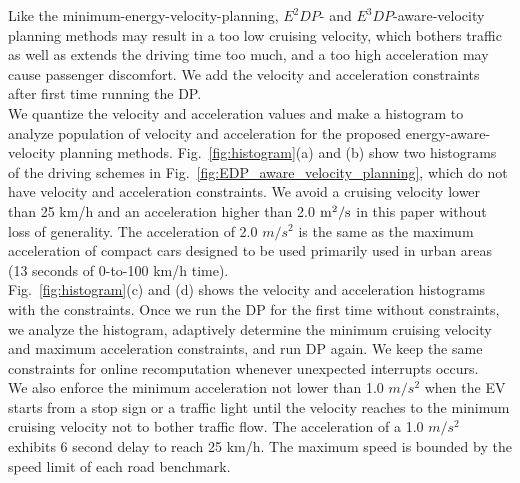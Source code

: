 \documentclass[onecolumn]{IEEEconf}
\begin{document}
\begin{description}
Like the minimum-energy-velocity-planning, $E^2DP$- and $E^3DP$-aware-velocity planning methods may result in a too low cruising velocity, which bothers traffic as well as extends the driving time too much, and a too high acceleration may cause passenger discomfort. We add the velocity and acceleration constraints after first time running the DP. \\
We quantize the velocity and acceleration values and make a histogram to analyze population of velocity and acceleration for the proposed energy-aware-velocity planning methods. Fig.~\ref{fig:histogram}(a) and (b) show two histograms of the driving schemes in Fig.~\ref{fig:EDP_aware_velocity_planning}, which do not have velocity and acceleration constraints. We avoid a cruising velocity lower than 25 km/h and an acceleration higher than 2.0 $\rm{m^2}/s$ in this paper without loss of generality. The  acceleration of 2.0 $m/s^2$ is the same as the maximum acceleration of compact cars designed to be used primarily used in urban areas (13 seconds of 0-to-100 km/h time).\\
Fig.~\ref{fig:histogram}(c) and (d) shows the velocity and acceleration histograms with the constraints. Once we run the DP for the first time without constraints, we analyze the histogram, adaptively determine the minimum cruising velocity and maximum acceleration constraints, and run DP again. We keep the same constraints for online recomputation whenever unexpected interrupts occurs.\\
We also enforce the minimum acceleration not lower than 1.0 $m/s^2$ when the EV starts from a stop sign or a traffic light until the velocity reaches to the minimum cruising velocity not to bother traffic flow. The acceleration of a 1.0 $m/s^2$ exhibits 6 second delay to reach 25 km/h. The maximum speed is bounded by the speed limit of each road benchmark.



\end{description}
\end{document}
